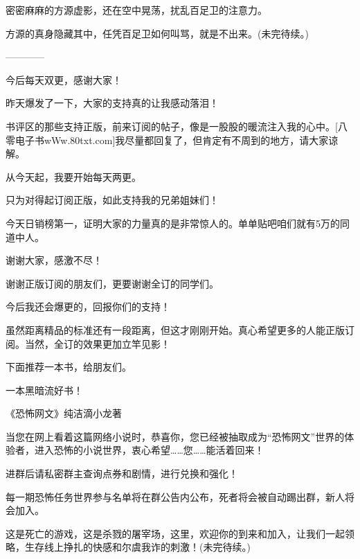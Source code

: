 \begin{this_body}
密密麻麻的方源虚影，还在空中晃荡，扰乱百足卫的注意力。

方源的真身隐藏其中，任凭百足卫如何叫骂，就是不出来。(未完待续。)

------------

今后每天双更，感谢大家！

昨天爆发了一下，大家的支持真的让我感动落泪！

书评区的那些支持正版，前来订阅的帖子，像是一股股的暖流注入我的心中。[八零电子书wWw.80txt.com]我尽量都回复了，但肯定有不周到的地方，请大家谅解。

从今天起，我要开始每天两更。

只为对得起订阅正版，如此支持我的兄弟姐妹们！

今天日销榜第一，证明大家的力量真的是非常惊人的。单单贴吧咱们就有5万的同道中人。

谢谢大家，感激不尽！

谢谢正版订阅的朋友们，更要谢谢全订的同学们。

今后我还会爆更的，回报你们的支持！

虽然距离精品的标准还有一段距离，但这才刚刚开始。真心希望更多的人能正版订阅。当然，全订的效果更加立竿见影！

下面推荐一本书，给朋友们。

一本黑暗流好书！

《恐怖网文》纯洁滴小龙著

当您在网上看着这篇网络小说时，恭喜你，您已经被抽取成为“恐怖网文”世界的体验者，进入恐怖的小说世界，衷心希望……您……能活着回来！

进群后请私密群主查询点券和剧情，进行兑换和强化！

每一期恐怖任务世界参与名单将在群公告内公布，死者将会被自动踢出群，新人将会加入。

这是死亡的游戏，这是杀戮的屠宰场，这里，欢迎你的到来和加入，让我们一起领略，生存线上挣扎的快感和尔虞我诈的刺激！(未完待续。)

\end{this_body}

